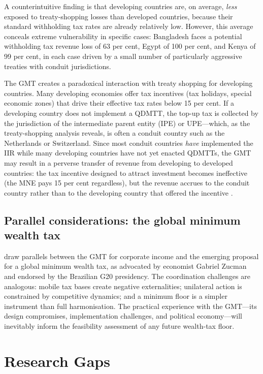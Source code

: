 \documentclass[12pt,a4paper]{article}
\begin{document}
A counterintuitive finding is that developing countries are, on average, \emph{less} exposed to treaty-shopping losses than developed countries, because their standard withholding tax rates are already relatively low.
However, this average conceals extreme vulnerability in specific cases: Bangladesh faces a potential withholding tax revenue loss of 63 per cent, Egypt of 100 per cent, and Kenya of 99 per cent, in each case driven by a small number of particularly aggressive treaties with conduit jurisdictions.

The GMT creates a paradoxical interaction with treaty shopping for developing countries.
Many developing economies offer tax incentives (tax holidays, special economic zones) that drive their effective tax rates below 15 per cent.
If a developing country does not implement a QDMTT, the top-up tax is collected by the jurisdiction of the intermediate parent entity (IPE) or UPE---which, as the treaty-shopping analysis reveals, is often a conduit country such as the Netherlands or Switzerland.
Since most conduit countries \emph{have} implemented the IIR while many developing countries have not yet enacted QDMTTs, the GMT may result in a perverse transfer of revenue from developing to developed countries: the tax incentive designed to attract investment becomes ineffective (the MNE pays 15 per cent regardless), but the revenue accrues to the conduit country rather than to the developing country that offered the incentive \parencite{vantriet2025}.

\subsection{Parallel considerations: the global minimum wealth tax}

\textcite{boadway2026} draw parallels between the GMT for corporate income and the emerging proposal for a global minimum wealth tax, as advocated by economist Gabriel Zucman and endorsed by the Brazilian G20 presidency.
The coordination challenges are analogous: mobile tax bases create negative externalities; unilateral action is constrained by competitive dynamics; and a minimum floor is a simpler instrument than full harmonisation.
The practical experience with the GMT---its design compromises, implementation challenges, and political economy---will inevitably inform the feasibility assessment of any future wealth-tax floor.


\section{Research Gaps}\label{sec:gaps}
\end{document}
